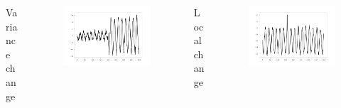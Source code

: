 \documentclass[intlimits, 9pt, unicode]{beamer}
\begin{document}
\begin{frame}
\begin{columns}
\begin{column}{0.5\textwidth}
  \begin{columns}
      \begin{column}{0.3\textwidth}
      \centering
      Variance change
      \end{column}
      \begin{column}{0.5\textwidth}
      \begin{figure}
		\includegraphics[scale=0.08]{images/examples_variance}
	\end{figure}
	\end{column}
     \end{columns}

	\end{column}

 \begin{column}{0.5\textwidth}
     
  \begin{columns}
      \begin{column}{0.3\textwidth}
      \centering
      Local change
      \end{column}
      \begin{column}{0.5\textwidth}
      \begin{figure}
		\includegraphics[scale=0.08]{images/examples_outlier}
	\end{figure}
	\end{column}
     \end{columns}
     

\end{column}
\end{columns}
\end{frame}
\end{document}
